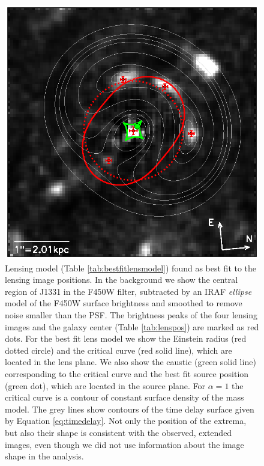 \documentclass[useAMS,usenatbib]{mnras}
\begin{document}
\begin{figure}
\centering
  \includegraphics[width=\linewidth]{lens_all_in_one.ps}
\caption{Lensing model (Table \ref{tab:bestfitlensmodel}) found as best fit to the lensing image positions. In the background we show the central region of J1331 in the F450W filter, subtracted by an IRAF \emph{ellipse} model of the F450W surface brightness and smoothed to remove noise smaller than the PSF. The brightness peaks of the four lensing images and the galaxy center (Table \ref{tab:lenspos}) are marked as red dots. For the best fit lens model we show the Einstein radius (red dotted circle) and the critical curve (red solid line), which are located in the lens plane. We also show the caustic (green solid line) corresponding to the critical curve and the best fit source position (green dot), which are located in the source plane. For $\alpha=1$ the critical curve is a contour of constant surface density of the mass model. The grey  lines show contours of the time delay surface given by Equation \eqref{eq:timedelay}. Not only the position of the extrema, but also their shape is consistent with the observed, extended images, even though we did not use information about the image shape in the analysis.}
\label{fig:bestfitlensmodel}
\end{figure}
\end{document}
